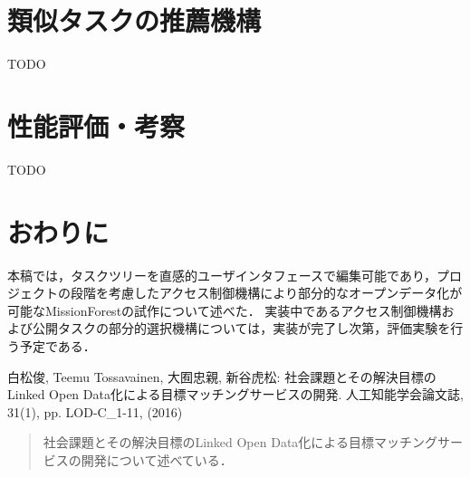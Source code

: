 \documentclass[a4j,twoside]{jarticle}
\begin{document}
\begin{論文概要}
\section{類似タスクの推薦機構}
TODO

\section{性能評価・考察}
TODO

\section{おわりに}
本稿では，タスクツリーを直感的ユーザインタフェースで編集可能であり，プロジェクトの段階を考慮したアクセス制御機構により部分的なオープンデータ化が可能なMissionForestの試作について述べた．
実装中であるアクセス制御機構および公開タスクの部分的選択機構については，実装が完了し次第，評価実験を行う予定である．


\begin{thebibliography}{9}
白松俊, Teemu Tossavainen, 大囿忠親, 新谷虎松: 社会課題とその解決目標のLinked Open Data化による目標マッチングサービスの開発. 人工知能学会論文誌, 31(1), pp. LOD-C\_1-11, (2016)
\begin{quote}
社会課題とその解決目標のLinked Open Data化による目標マッチングサービスの開発について述べている．
\end{quote}

\end{thebibliography}
%
\clearpage                       %
\end{論文概要}                   %
\end{document}
